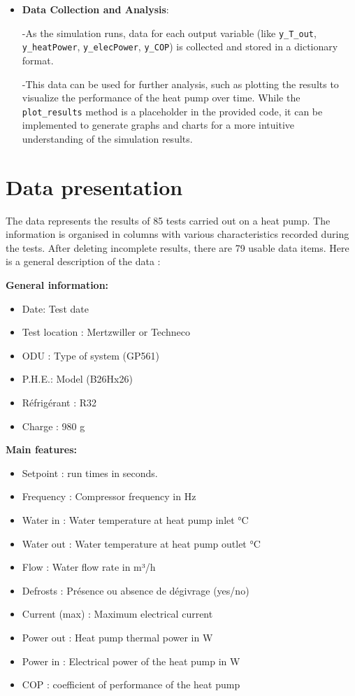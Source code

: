 \documentclass{report}
\begin{document}
\begin{itemize}
        -Exception handling is incorporated to ensure any errors during simulation are caught and handled appropriately, preventing crashes and providing meaningful error messages.

    \item \textbf{Data Collection and Analysis}:
        
        -As the simulation runs, data for each output variable (like \texttt{y\_T\_out}, \texttt{y\_heatPower}, \texttt{y\_elecPower}, \texttt{y\_COP}) is collected and stored in a dictionary format.
        
        -This data can be used for further analysis, such as plotting the results to visualize the performance of the heat pump over time. While the \texttt{plot\_results} method is a placeholder in the provided code, it can be implemented to generate graphs and charts for a more intuitive understanding of the simulation results.
\end{itemize}




\section{Data presentation}

The data represents the results of 85 tests carried out on a heat pump. The information is organised in columns with various characteristics recorded during the tests. After deleting incomplete results, there are 79 usable data items. Here is a general description of the data :

\textbf{General information:}
\begin{itemize}
    \item Date: Test date
    \item Test location :  Mertzwiller or Techneco
    \item ODU : Type of system (GP561)  
    \item P.H.E.: Model (B26Hx26)
    \item Réfrigérant : R32 
    \item Charge : 980 g
\end{itemize}

\textbf{Main features:}
\begin{itemize}
    \item Setpoint : run times in seconds.
    \item Frequency : Compressor frequency in Hz
    \item Water in : Water temperature at heat pump inlet °C
    \item Water out : Water temperature at heat pump outlet °C
    \item Flow : Water flow rate in m³/h
    \item Defrosts : Présence ou absence de dégivrage (yes/no)
    \item Current (max) : Maximum electrical current
    \item Power out : Heat pump thermal power in W
    \item Power in : Electrical power of the heat pump in W
    \item COP : coefficient of performance of the heat pump
\end{itemize}
\end{document}
